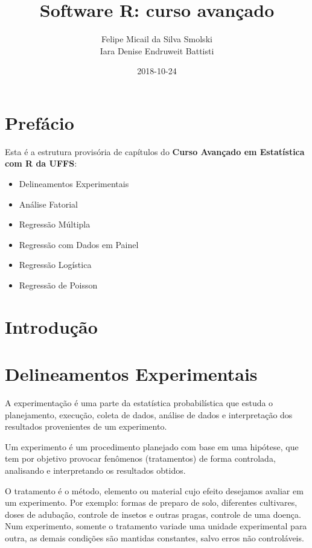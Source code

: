 \documentclass[12pt,brazil,oneside]{book}
\title{Software R: curso avançado}
\author{Felipe Micail da Silva Smolski \\ Iara Denise Endruweit Battisti}
\date{2018-10-24}
\providecommand{\tightlist}{%
  \setlength{\itemsep}{0pt}\setlength{\parskip}{0pt}}
\begin{document}
\maketitle

{
\setcounter{tocdepth}{1}
\tableofcontents
}
\hypertarget{prefacio}{%
\chapter*{Prefácio}\label{prefacio}}

Esta é a estrutura provisória de capítulos do \textbf{Curso Avançado em
Estatística com R da UFFS}:

\begin{itemize}
\tightlist
\item
  Delineamentos Experimentais
\item
  Análise Fatorial
\item
  Regressão Múltipla
\item
  Regressão com Dados em Painel
\item
  Regressão Logística
\item
  Regressão de Poisson
\end{itemize}

\hypertarget{introducao}{%
\chapter*{Introdução}\label{introducao}}

\hypertarget{delineamentos-experimentais}{%
\chapter{Delineamentos
Experimentais}\label{delineamentos-experimentais}}

A experimentação é uma parte da estatística probabilística que estuda o
planejamento, execução, coleta de dados, análise de dados e
interpretação dos resultados provenientes de um experimento.

Um experimento é um procedimento planejado com base em uma hipótese, que
tem por objetivo provocar fenômenos (tratamentos) de forma controlada,
analisando e interpretando os resultados obtidos.

O tratamento é o método, elemento ou material cujo efeito desejamos
avaliar em um experimento. Por exemplo: formas de preparo de solo,
diferentes cultivares, doses de adubação, controle de insetos e outras
pragas, controle de uma doença. Num experimento, somente o tratamento
variade uma unidade experimental para outra, as demais condições são
mantidas constantes, salvo erros não controláveis.
\end{document}
